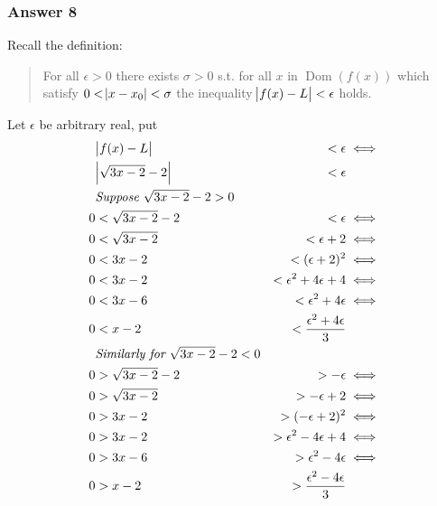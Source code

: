 \documentclass[a4paper]{article}
\DeclareMathOperator{\Dom}{Dom}
\begin{document}
\subsubsection{Answer 8}
\label{sec-1-3-1}
Recall the definition:
\begin{quote}
For all $\epsilon > 0$ there exists $\sigma > 0$ s.t. for all $x$ in
$\Dom(f(x))$ which satisfy $0 < \abs{x - x_0} < \sigma$ the inequality
$\abs{f(x) - L} < \epsilon$ holds.
\end{quote}

Let $\epsilon$ be arbitrary real, put
\begin{equation*}
  \begin{aligned}
      &\abs{f(x) - L}          &< \epsilon                         &\iff \\
      &\abs{\sqrt{3x - 2} - 2} &< \epsilon                               \\
      &\textit{Suppose $\sqrt{3x - 2} - 2 > 0$}                          \\
    0 &< \sqrt{3x - 2} - 2     &< \epsilon                         &\iff \\
    0 &< \sqrt{3x - 2}         &< \epsilon + 2                     &\iff \\
    0 &< 3x - 2                &< (\epsilon + 2)^2                 &\iff \\
    0 &< 3x - 2                &< \epsilon^2 + 4\epsilon + 4       &\iff \\
    0 &< 3x - 6                &< \epsilon^2 + 4\epsilon           &\iff \\
    0 &< x - 2                 &< \frac{\epsilon^2 + 4\epsilon}{3}       \\
      &\textit{Similarly for $\sqrt{3x - 2} - 2 < 0$}                    \\
    0 &> \sqrt{3x - 2} - 2     &> -\epsilon                        &\iff \\
    0 &> \sqrt{3x - 2}         &> -\epsilon + 2                    &\iff \\
    0 &> 3x - 2                &> (-\epsilon + 2)^2                &\iff \\
    0 &> 3x - 2                &> \epsilon^2 - 4\epsilon + 4       &\iff \\
    0 &> 3x - 6                &> \epsilon^2 - 4\epsilon           &\iff \\
    0 &> x - 2                 &> \frac{\epsilon^2 - 4\epsilon}{3}
  \end{aligned}
\end{equation*}
\end{document}
